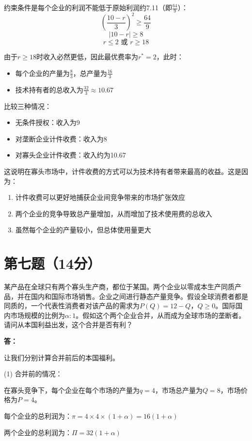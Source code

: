 \documentclass[12pt]{article}
\begin{document}
\begin{enumerate}
约束条件是每个企业的利润不能低于原始利润约7.11（即$\frac{64}{9}$）：
\[(\frac{10-r}{3})^2\geq\frac{64}{9}\]
\[|10-r|\geq 8\]
\[r\leq 2 \text{ 或 } r\geq 18\]

由于$r\geq 18$时收入必然更低，因此最优费率为$r^*=2$，此时：
\begin{itemize}
\item 每个企业的产量为$\frac{8}{3}$，总产量为$\frac{16}{3}$
\item 技术持有者的总收入为$\frac{32}{3}\approx 10.67$
\end{itemize}

比较三种情况：
\begin{itemize}
\item 无条件授权：收入为9
\item 对垄断企业计件收费：收入为8
\item 对寡头企业计件收费：收入约为10.67
\end{itemize}

这说明在寡头市场中，计件收费的方式可以为技术持有者带来最高的收益。这是因为：
\begin{enumerate}
\item 计件收费可以更好地捕获企业间竞争带来的市场扩张效应
\item 两个企业的竞争导致总产量增加，从而增加了技术使用费的总收入
\item 虽然每个企业的产量较小，但总体使用量更大
\end{enumerate}
\end{enumerate}

\section*{第七题（14分）}
某产品在全球只有两个寡头生产商，都位于某国。两个企业以零成本生产同质产品，并在国内和国际市场销售。企业之间进行静态产量竞争。假设全球消费者都是同质的，一个代表性消费者对该产品的需求为$P(Q)=12-Q$，$Q\geq0$。国际国内市场规模的比例为$\alpha:1$。假如这个两个企业合并，从而成为全球市场的垄断者。请问从本国利益出发，这个合并是否有利？

\noindent \textbf{答：}

让我们分别计算合并前后的本国福利。

(1) 合并前的情况：

在寡头竞争下，每个企业在每个市场的产量为$q=4$，市场总产量为$Q=8$，市场价格为$P=4$。

每个企业的总利润为：$\pi = 4 \times 4 \times (1+\alpha) = 16(1+\alpha)$

两个企业的总利润为：$\Pi = 32(1+\alpha)$
\end{document}
